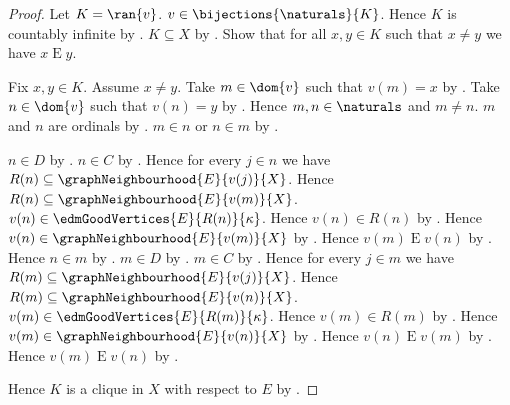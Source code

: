 \begin{proof}
    Let $K=\ran{v}$.
    $v\in\bijections{\naturals}{K}$.
    Hence $K$ is countably infinite by
        .
    $K\subseteq X$ by .
    Show that for all $x,y\in K$ such that $x\neq y$ we have
        $x\mathrel{E}y$.
    \begin{subproof}
        Fix $x,y\in K$.
        Assume $x\neq y$.
        Take $m\in\dom{v}$ such that $v(m)=x$ by
            .
        Take $n\in\dom{v}$ such that $v(n)=y$ by
            .
        Hence $m,n\in\naturals$ and $m\neq n$.
        $m$ and $n$ are ordinals by .
        $m\in n$ or $n\in m$ by .
        \begin{byCase}
                $n\in D$ by .
                $n\in C$ by .
                Hence for every $j\in n$ we have
                    $R(n)\subseteq\graphNeighbourhood{E}{v(j)}{X}$.
                Hence $R(n)\subseteq\graphNeighbourhood{E}{v(m)}{X}$.
                $v(n)\in\edmGoodVertices{E}{R(n)}{\kappa}$.
                Hence $v(n)\in R(n)$ by
                    .
                Hence $v(n)\in\graphNeighbourhood{E}{v(m)}{X}$ by
                    .
                Hence $v(m)\mathrel{E}v(n)$ by
                    .
                Hence $n\in m$ by .
                $m\in D$ by .
                $m\in C$ by .
                Hence for every $j\in m$ we have
                    $R(m)\subseteq\graphNeighbourhood{E}{v(j)}{X}$.
                Hence $R(m)\subseteq\graphNeighbourhood{E}{v(n)}{X}$.
                $v(m)\in\edmGoodVertices{E}{R(m)}{\kappa}$.
                Hence $v(m)\in R(m)$ by
                    .
                Hence $v(m)\in\graphNeighbourhood{E}{v(n)}{X}$ by
                    .
                Hence $v(n)\mathrel{E}v(m)$ by
                    .
                Hence $v(m)\mathrel{E}v(n)$ by
                    .
        \end{byCase}
    \end{subproof}
    Hence $K$ is a clique in $X$ with respect to $E$ by
        .
\end{proof}
